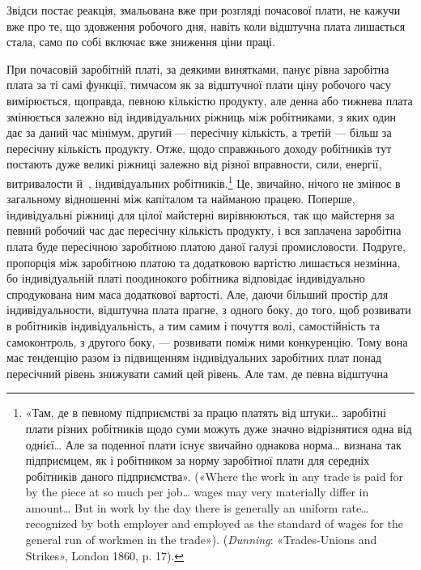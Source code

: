 \parcont{}  %
Звідси постає реакція, змальована вже при розгляді почасової
плати, не кажучи вже про те, що здовження робочого дня, навіть
коли відштучна плата лишається стала, само по собі включає
вже зниження ціни праці.

При почасовій заробітній платі, за деякими винятками, панує
рівна заробітна плата за ті самі функції, тимчасом як за відштучної
плати ціну робочого часу вимірюється, щоправда, певною
кількістю продукту, але денна або тижнева плата змінюється
залежно від індивідуальних ріжниць між робітниками, з яких
один дає за даний час мінімум, другий — пересічну кількість,
а третій — більш за пересічну кількість продукту. Отже, щодо
справжнього доходу робітників тут постають дуже великі ріжниці
залежно від різної вправности, сили, енергії, витривалости
й~, індивідуальних робітників.\footnote{
«Там, де в певному підприємстві за працю платять від штуки\dots{}
заробітні плати різних робітників щодо суми можуть дуже значно відрізнятися
одна від однієї\dots{} Але за поденної плати існує звичайно однакова
норма\dots{} визнана так підприємцем, як і робітником за норму заробітної
плати для середніх робітників даного підприємства». («Where the
work in any trade is paid for by the piece at so much per job\dots{} wages may
very materially differ in amount\dots{} But in work by the day there is generally
an uniform rate\dots{} recognized by both employer and employed as the
standard of wages for the general run of workmen in the trade»). (\emph{Dunning}:
«Trades-Unions and Strikes», London 1860, p. 17).
} Це, звичайно, нічого не
змінює в загальному відношенні між капіталом та найманою
працею. Поперше, індивідуальні ріжниці для цілої майстерні
вирівнюються, так що майстерня за певний робочий час дає пересічну
кількість продукту, і вся заплачена заробітна плата буде
пересічною заробітною платою даної галузі промисловости. Подруге,
пропорція між заробітною платою та додатковою вартістю
лишається незмінна, бо індивідуальній платі поодинокого робітника
відповідає індивідуально спродукована ним маса додаткової
вартості. Але, даючи більший простір для індивідуальности,
відштучна плата прагне, з одного боку, до того, щоб розвивати в
робітників індивідуальність, а тим самим і почуття волі, самостійність
та самоконтроль, з другого боку, — розвивати поміж
ними конкуренцію. Тому вона має тенденцію разом із підвищенням
індивідуальних заробітних плат понад пересічний рівень
знижувати самий цей рівень. Але там, де певна відштучна
